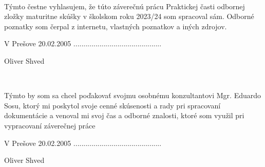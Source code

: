 \thispagestyle{empty}
\begin{center}
   \\
\end{center}
\vspace{2cm}
Týmto čestne vyhlasujem, že túto záverečnú prácu Praktickej časti odbornej zložky maturitne skúšky v školskom roku 2023/24 som spracoval sám. Odborné poznatky som čerpal z internetu, vlastných poznatkov a iných zdrojov. \\

\vspace{2cm}

V Prešove 20.02.2005 \hspace*{5cm}  ............................................

\begin{adjustwidth}{0}{2cm}
  \begin{flushright}
    Oliver Shved
  \end{flushright}
\end{adjustwidth}

\emptypage


\begin{center}
   \\
\end{center}
\vspace{2cm}
Týmto by som sa chcel poďakovať svojmu osobnému konzultantovi Mgr. Eduardo Sosu, ktorý mi poskytol svoje cenné skúsenosti a rady pri spracovaní dokumentácie a venoval mi svoj čas a odborné znalosti, ktoré som využil pri vypracovaní záverečnej práce \\

\vspace{2cm}

V Prešove 20.02.2005 \hspace*{5cm}  ............................................

\begin{adjustwidth}{0}{2cm}
  \begin{flushright}
    Oliver Shved
  \end{flushright}
\end{adjustwidth}

